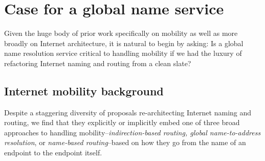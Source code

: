 \vspace{-0.1in}
\section{Case for a global name service}
\label{sec:case}

Given the huge body of prior work specifically on mobility as well as more broadly on Internet architecture, it is natural to  begin by asking:  Is a global name resolution service critical to handling mobility if we had the luxury of refactoring Internet naming and routing from a clean slate? %



\subsection{Internet mobility background}

\label{sec:bg}




Despite a staggering diversity of proposals re-architecting Internet naming and routing, we find that they explicitly or implicitly embed one of three broad approaches to handling mobility--{\em indirection-based routing, global name-to-address resolution}, or {\em name-based routing}--based on how they go from the name of an endpoint to the endpoint itself.



